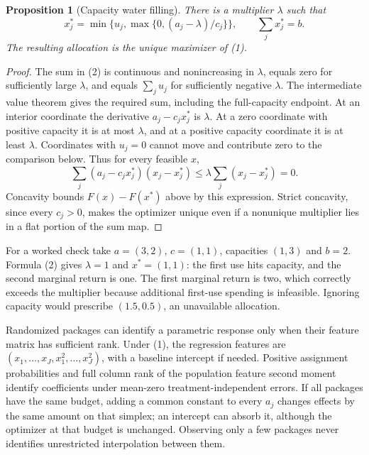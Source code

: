 \documentclass[11pt,a4paper]{article}
\newtheorem{proposition}[theorem]{Proposition}
\begin{document}
\begin{proposition}[Capacity water filling]
There is a multiplier $\lambda$ such that
\[
 x_j^*=\min\{u_j,\max\{0,(a_j-\lambda)/c_j\}\},\qquad
 \sum_jx_j^*=b.                                      \tag{2}
\]
The resulting allocation is the unique maximizer of (1).
\end{proposition}
\begin{proof}
The sum in (2) is continuous and nonincreasing in $\lambda$, equals zero for sufficiently large $\lambda$, and equals $\sum_j u_j$ for sufficiently negative $\lambda$. The intermediate value theorem gives the required sum, including the full-capacity endpoint. At an interior coordinate the derivative $a_j-c_jx_j^*$ is $\lambda$. At a zero coordinate with positive capacity it is at most $\lambda$, and at a positive capacity coordinate it is at least $\lambda$. Coordinates with $u_j=0$ cannot move and contribute zero to the comparison below. Thus for every feasible $x$,
\[
 \sum_j(a_j-c_jx_j^*)(x_j-x_j^*)\le
 \lambda\sum_j(x_j-x_j^*)=0.
\]
Concavity bounds $F(x)-F(x^*)$ above by this expression. Strict concavity, since every $c_j>0$, makes the optimizer unique even if a nonunique multiplier lies in a flat portion of the sum map.
\end{proof}

For a worked check take $a=(3,2)$, $c=(1,1)$, capacities $(1,3)$ and $b=2$. Formula (2) gives $\lambda=1$ and $x^*=(1,1)$: the first use hits capacity, and the second marginal return is one. The first marginal return is two, which correctly exceeds the multiplier because additional first-use spending is infeasible. Ignoring capacity would prescribe $(1.5,0.5)$, an unavailable allocation.

Randomized packages can identify a parametric response only when their feature matrix has sufficient rank. Under (1), the regression features are $(x_1,\ldots,x_J,x_1^2,\ldots,x_J^2)$, with a baseline intercept if needed. Positive assignment probabilities and full column rank of the population feature second moment identify coefficients under mean-zero treatment-independent errors. If all packages have the same budget, adding a common constant to every $a_j$ changes effects by the same amount on that simplex; an intercept can absorb it, although the optimizer at that budget is unchanged. Observing only a few packages never identifies unrestricted interpolation between them.
\end{document}
